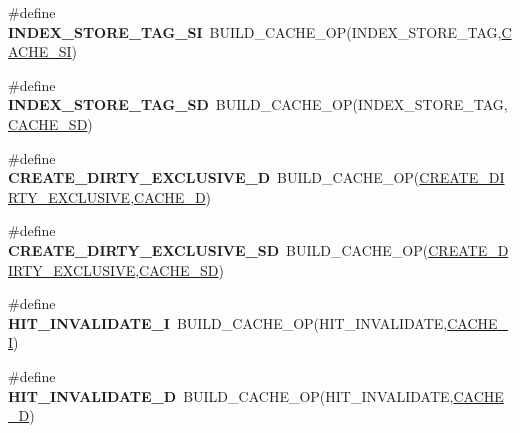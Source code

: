 \begin{DoxyCompactItemize}
\#define {\bfseries I\+N\+D\+E\+X\+\_\+\+S\+T\+O\+R\+E\+\_\+\+T\+A\+G\+\_\+\+SI}~B\+U\+I\+L\+D\+\_\+\+C\+A\+C\+H\+E\+\_\+\+OP(I\+N\+D\+E\+X\+\_\+\+S\+T\+O\+R\+E\+\_\+\+T\+AG,\mbox{\hyperlink{group__mips__regs_gaa127e30b313e010b0c7b53c97503b6ce}{C\+A\+C\+H\+E\+\_\+\+SI}})
\item 
\mbox{\label{group__mips__regs_ga7150449cd0dea89ca9d5de98374110f6}} 
\#define {\bfseries I\+N\+D\+E\+X\+\_\+\+S\+T\+O\+R\+E\+\_\+\+T\+A\+G\+\_\+\+SD}~B\+U\+I\+L\+D\+\_\+\+C\+A\+C\+H\+E\+\_\+\+OP(I\+N\+D\+E\+X\+\_\+\+S\+T\+O\+R\+E\+\_\+\+T\+AG,\mbox{\hyperlink{group__mips__regs_gae713c0e6cb5df3df0030d5d87bb16a6d}{C\+A\+C\+H\+E\+\_\+\+SD}})
\item 
\mbox{\label{group__mips__regs_ga7fe0e465b52391792d7499badef9bda0}} 
\#define {\bfseries C\+R\+E\+A\+T\+E\+\_\+\+D\+I\+R\+T\+Y\+\_\+\+E\+X\+C\+L\+U\+S\+I\+V\+E\+\_\+D}~B\+U\+I\+L\+D\+\_\+\+C\+A\+C\+H\+E\+\_\+\+OP(\mbox{\hyperlink{group__mips__regs_ga97907e5b8271912811beab2e8e268613}{C\+R\+E\+A\+T\+E\+\_\+\+D\+I\+R\+T\+Y\+\_\+\+E\+X\+C\+L\+U\+S\+I\+VE}},\mbox{\hyperlink{group__mips__regs_ga0fba561a0aa459e322839f78cc09f839}{C\+A\+C\+H\+E\+\_\+D}})
\item 
\mbox{\label{group__mips__regs_ga7ad09e40c745966ebfef2d9c32ae8a08}} 
\#define {\bfseries C\+R\+E\+A\+T\+E\+\_\+\+D\+I\+R\+T\+Y\+\_\+\+E\+X\+C\+L\+U\+S\+I\+V\+E\+\_\+\+SD}~B\+U\+I\+L\+D\+\_\+\+C\+A\+C\+H\+E\+\_\+\+OP(\mbox{\hyperlink{group__mips__regs_ga97907e5b8271912811beab2e8e268613}{C\+R\+E\+A\+T\+E\+\_\+\+D\+I\+R\+T\+Y\+\_\+\+E\+X\+C\+L\+U\+S\+I\+VE}},\mbox{\hyperlink{group__mips__regs_gae713c0e6cb5df3df0030d5d87bb16a6d}{C\+A\+C\+H\+E\+\_\+\+SD}})
\item 
\mbox{\label{group__mips__regs_ga1cc3612e0d7e9b5244dfc68720d00a15}} 
\#define {\bfseries H\+I\+T\+\_\+\+I\+N\+V\+A\+L\+I\+D\+A\+T\+E\+\_\+I}~B\+U\+I\+L\+D\+\_\+\+C\+A\+C\+H\+E\+\_\+\+OP(H\+I\+T\+\_\+\+I\+N\+V\+A\+L\+I\+D\+A\+TE,\mbox{\hyperlink{group__mips__regs_gac038c307d75c414069699d4c2741714f}{C\+A\+C\+H\+E\+\_\+I}})
\item 
\mbox{\label{group__mips__regs_ga402793faff6398d5609c677b4cce6cc4}} 
\#define {\bfseries H\+I\+T\+\_\+\+I\+N\+V\+A\+L\+I\+D\+A\+T\+E\+\_\+D}~B\+U\+I\+L\+D\+\_\+\+C\+A\+C\+H\+E\+\_\+\+OP(H\+I\+T\+\_\+\+I\+N\+V\+A\+L\+I\+D\+A\+TE,\mbox{\hyperlink{group__mips__regs_ga0fba561a0aa459e322839f78cc09f839}{C\+A\+C\+H\+E\+\_\+D}})

\end{DoxyCompactItemize}
